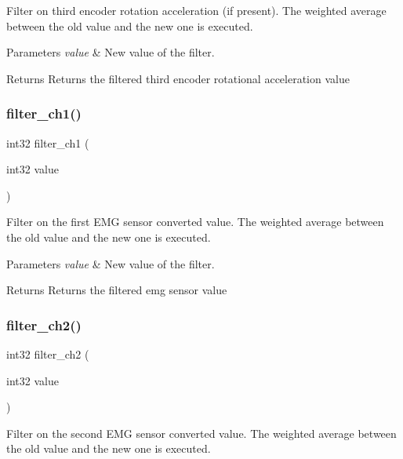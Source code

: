Filter on third encoder rotation acceleration (if present). The weighted average between the old value and the new one is executed.


\begin{DoxyParams}{Parameters}
{\em value} & New value of the filter.\\
\hline
\end{DoxyParams}
\begin{DoxyReturn}{Returns}
Returns the filtered third encoder rotational acceleration value 
\end{DoxyReturn}
\mbox{\label{utils_8c_a9bed4948a884d80dc0d3511648e8eef3}} 
\subsubsection{filter\+\_\+ch1()}
{\footnotesize\ttfamily int32 filter\+\_\+ch1 (\begin{DoxyParamCaption}\item[{int32}]{value }\end{DoxyParamCaption})}

Filter on the first E\+MG sensor converted value. The weighted average between the old value and the new one is executed.


\begin{DoxyParams}{Parameters}
{\em value} & New value of the filter.\\
\hline
\end{DoxyParams}
\begin{DoxyReturn}{Returns}
Returns the filtered emg sensor value 
\end{DoxyReturn}
\mbox{\label{utils_8c_a66c5359b055eac4ae46c8146a9c45730}} 
\subsubsection{filter\+\_\+ch2()}
{\footnotesize\ttfamily int32 filter\+\_\+ch2 (\begin{DoxyParamCaption}\item[{int32}]{value }\end{DoxyParamCaption})}

Filter on the second E\+MG sensor converted value. The weighted average between the old value and the new one is executed.


